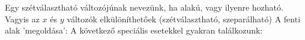 Egy  szétválasztható változójúnak nevezünk, ha
alakú, vagy ilyenre hozható. Vagyis az $x$ és $y$ változók elkülöníthetőek 
(szétválasztható, szeparálható)\newline
A fenti alak 'megoldása':
A következő speciális esetekkel gyakran találkozunk:
